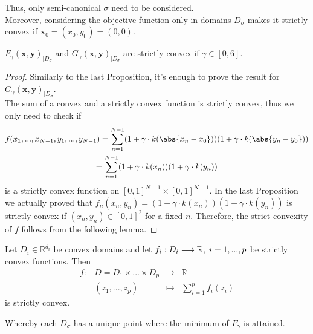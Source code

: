 Thus, only semi-canonical $\sigma$ need to be considered.\\

Moreover, considering the objective function only in domains $D_{\sigma}$ makes it strictly convex if $\textbf{x}_0 = (x_0,y_0) = (0,0)$.\\

\begin{Prop}
    $F_{\gamma}(\textbf{x},\textbf{y})_{\mid D_{\sigma}}$ and $G_{\gamma}(\textbf{x},\textbf{y})_{\mid D_{\sigma}}$ are strictly convex if $\gamma \in [0,6]$.
\end{Prop}

\begin{proof} Similarly to the last Proposition, it's enough to prove the result for $G_{\gamma}(\textbf{x},\textbf{y})_{\mid D_{\sigma}}$.\\

The sum of a convex and a strictly convex function is strictly convex,  thus we only need to check if 
\begin{multline*}
    f(x_1,...,x_{N-1},y_1,...,y_{N-1}) = \sum_{n=1}^{N-1} (1 + \gamma \cdot k(\abs{x_n-x_0}))(1 + \gamma \cdot k(\abs{y_n-y_0})) \\
    = \sum_{n=1}^{N-1} (1 + \gamma \cdot k(x_n))(1 + \gamma \cdot k(y_n))
\end{multline*}
is a strictly convex function on $[0,1]^{N-1}\times[0,1]^{N-1}$. In the last Proposition we actually proved that $f_n(x_n,y_n) = (1 + \gamma \cdot k(x_n))(1 + \gamma \cdot k(y_n))$ is strictly convex if $(x_n,y_n)\in [0,1]^2$ for a fixed $n$. Therefore, the strict convexity of $f$ follows from the following lemma.
\end{proof}

\vspace{2mm}
\begin{Lemma}
    Let $D_i \in \mathbb{R}^{d_i}$ be convex domains and let $f_i : D_i \longrightarrow \mathbb{R}, \hspace{1mm} i=1,...,p$ be strictly convex functions. Then
    \begin{equation*}
        \begin{matrix}
            f: & D=D_1\times ... \times D_p & \longrightarrow & \mathbb{R} \\
               & (z_1,...,z_p) & \longmapsto & \sum_{i=1}^{p} f_i(z_i)
        \end{matrix}
    \end{equation*}
    is strictly convex.
\end{Lemma}
\vspace{2mm}
Whereby each $D_\sigma$ has a unique point where the minimum of $F_\gamma$ is attained.\\


